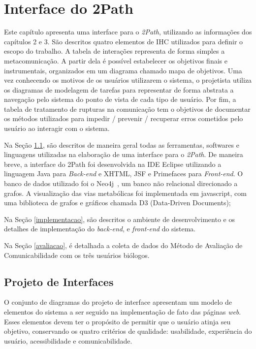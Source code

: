 \chapter{Interface do 2Path}

\indent Este capítulo apresenta uma interface para o \textit{2Path}, utilizando as informações dos capítulos 2 e 3. São descritos quatro elementos de IHC utilizados para definir o escopo do trabalho. A tabela de interações representa de forma simples a metacomunicação. A partir dela é possível estabelecer os objetivos finais e instrumentais, organizados em um diagrama chamado mapa de objetivos. Uma vez conhecendo os motivos de os usuários utilizarem o sistema, o projetista utiliza os diagramas de modelagem de tarefas para representar de forma abstrata a navegação pelo sistema do ponto de vista de cada tipo de usuário. Por fim, a tabela de tratamento de rupturas na comunicação tem o objetivos de documentar os métodos utilizados para impedir / prevenir / recuperar erros cometidos pelo usuário ao interagir com o sistema.

\indent Na Seção \ref{projeto}, são descritos de maneira geral todas as ferramentas, softwares e linguagens utilizadas na elaboração de uma interface para o \textit{2Path}. De maneira breve, a interface do 2Path foi desenvolvida na IDE Eclipse utilizando a linguagem Java para \textit{Back-end} e XHTML, JSF e Primefaces para \textit{Front-end}. O banco de dados utilizado foi o Neo4j~\cite{waldeyr}, um banco não relacional direcionado a grafos. A visualização das vias metabólicas foi implementada em javascript, com uma biblioteca de grafos e gráficos chamada D3 (Data-Driven Documents);

\indent Na Seção \ref{implementacao}, são descritos o ambiente de desenvolvimento e os detalhes de implementação do \textit{back-end}, e \textit{front-end} do sistema.

\indent Na Seção \ref{avaliacao}, é detalhada a coleta de dados do Método de Avaliação de Comunicabilidade com os três usuários biólogos.

\section{Projeto de Interfaces} \label{projeto}

\indent O conjunto de diagramas do projeto de interface apresentam um modelo de elementos do sistema a ser seguido na implementação de fato das páginas \textit{web}. Esses elementos devem ter o propósito de permitir que o usuário atinja seu objetivo, conservando os quatro critérios de qualidade: usabilidade, experiência do usuário, acessibilidade e comunicabilidade.

